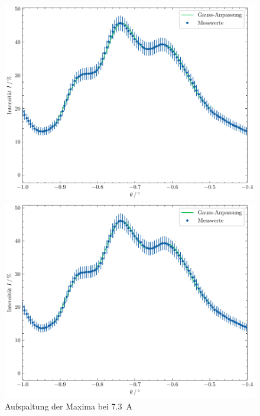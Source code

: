 \begin{figure}[h]
    \centering
    \begin{minipage}{0.45\linewidth}
        \centering
        \includegraphics[width=\linewidth]{../figs/gauss_i7.0.pdf}
        \caption{Aufspaltung der Maxima bei \SI{7.0}{\ampere}}
        \label{fig:gauss_i70}
    \end{minipage}
    \hspace{.5cm}
    \begin{minipage}{0.45\linewidth} 
        \centering
        \includegraphics[width=\linewidth]{../figs/gauss_i7.3.pdf}
        \caption{Aufspaltung der Maxima bei \SI{7.3}{\ampere}} 
        \label{fig:gauss_i73}
    \end{minipage}
\end{figure}

